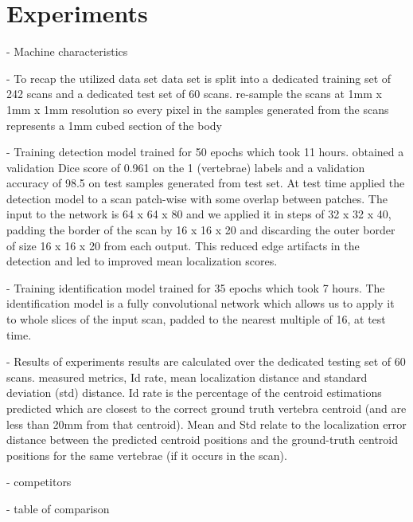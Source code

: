\chapter{Experiments}
\label{ch:experiments}
- Machine characteristics

%
- To recap the utilized data set
data set is split into a dedicated training set of 242
scans and a dedicated test set of 60 scans. re-sample the scans at
1mm x 1mm x 1mm resolution so every pixel in the samples generated from the scans represents a 1mm cubed section of the body

%
- Training detection model
trained for 50 epochs which took 11 hours. obtained a validation Dice score of 0.961 on the 1 (vertebrae) labels and a validation accuracy of 98.5 on test samples generated from test set.
At test time applied the detection model to a scan patch-wise with some overlap between patches. The input to the network is 64 x 64 x 80 and we applied it in steps of 32 x 32 x 40, padding the border of the scan by 16 x 16 x 20 and discarding the outer border of size 16 x 16 x 20 from each output. This reduced edge artifacts in the detection and led to improved mean localization scores.

%
- Training identification model
trained for 35 epochs which took 7 hours.
The identification model is a fully convolutional network which allows us to apply it to whole slices of the input scan, padded to the nearest multiple of 16, at test time.


%
- Results of experiments
results are calculated over the dedicated testing set of
60 scans. measured metrics, Id rate, mean localization distance and standard deviation (std) distance. Id rate is the percentage of the centroid estimations predicted which are closest to the correct ground truth vertebra centroid (and are less than 20mm from that centroid). Mean and Std relate to the localization error distance between the predicted centroid positions and the ground-truth centroid positions for the same vertebrae (if it occurs in the scan).

%
- competitors

%
- table of comparison